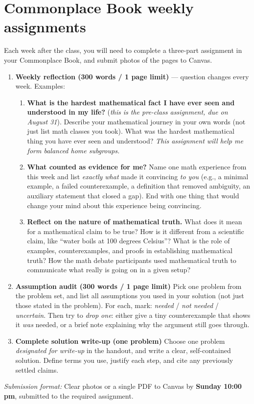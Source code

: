 \documentclass[oneside,11pt]{amsart}
\begin{document}
\section{Commonplace Book weekly assignments}

Each week after the class,
you will need to complete a three-part assignment in your Commonplace Book,
and submit photos of the pages to Canvas.

\begin{enumerate}[(1)]
  \item
	\textbf{Weekly reflection (300 words / 1 page limit)} --- question changes
	every week. Examples:
	\begin{enumerate}
	\item
		\textbf{What is the hardest mathematical fact I have ever seen and understood
		in my life?}
		(\emph{this is the pre-class assignment, due on August 31}).
		Describe your mathematical journey in your own words (not just list
		math classes you took). What was the hardest mathematical thing you
		have ever seen and understood?
		\emph{This assignment will help me form balanced home subgroups.}
	\item
		\textbf{What counted as evidence for me?}
		Name one math experience from this week
		and list \emph{exactly what} made it convincing \emph{to
		you} (e.g., a minimal example, a failed counterexample, a
		definition that removed ambiguity, an auxiliary statement
		that closed a gap).
		End with one thing that would change your mind about
		this experience being convincing.
	\item \textbf{Reflect on the nature of mathematical truth.}
		What does it mean for a mathematical claim to be true?
		How is it different from a scientific claim, like
		``water boils at 100 degrees Celsius''?
		What is the role of examples, counterexamples, and proofs
		in establishing mathematical truth?
		How the math debate participants used mathematical truth to communicate
		what really is going on in a given setup?
	\end{enumerate}

  \item \textbf{Assumption audit (300 words / 1 page limit)}
	Pick one problem from the problem set, and list all
	assumptions you used in your solution
	(not just those stated in the problem). For each, mark:
	\emph{needed} / \emph{not needed} / \emph{uncertain}. Then
	try to \emph{drop one}: either give a tiny counterexample
	that shows it \emph{was} needed, or a brief note
	explaining why the argument still goes through.

  \item \textbf{Complete solution write-up (one problem)}
  Choose one problem \emph{designated for write-up} in the handout, and write a clear, self-contained solution. Define terms you use, justify each step, and cite any previously settled claims.
\end{enumerate}
\emph{Submission format:} Clear photos or a single PDF to Canvas by \textbf{Sunday 10:00\,pm}, submitted to the required assignment.
\end{document}
